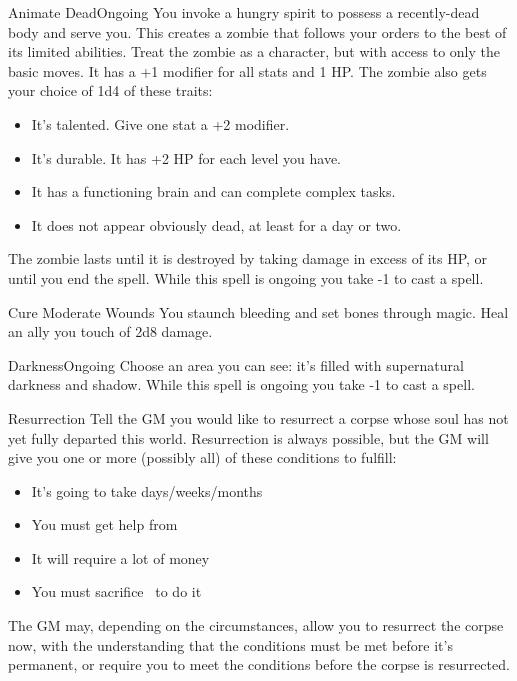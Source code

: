 \documentclass[8pt]{extarticle}
\begin{document}
\begin{multicols}{2}
  \begin{aspell}{Animate Dead}{Ongoing}
    You invoke a hungry spirit to possess a recently-dead body and
    serve you. This creates a zombie that follows your orders to the
    best of its limited abilities. Treat the zombie as a character,
    but with access to only the basic moves. It has a +1 modifier for
    all stats and 1 HP. The zombie also gets your choice of 1d4 of
    these traits:
    \begin{itemize}
    \item It’s talented. Give one stat a +2 modifier.
    \item It’s durable. It has +2 HP for each level you have.
    \item It has a functioning brain and can complete complex tasks.
    \item It does not appear obviously dead, at least for a day or
      two.
    \end{itemize}
    The zombie lasts until it is destroyed by taking damage in excess
    of its HP, or until you end the spell. While this spell is ongoing
    you take -1 to cast a spell.
  \end{aspell}

  \begin{aspell}{Cure Moderate Wounds}{}
    You staunch bleeding and set bones through magic. Heal an ally you
    touch of 2d8 damage.
  \end{aspell}

  \begin{aspell}{Darkness}{Ongoing}
    Choose an area you can see: it’s filled with supernatural darkness
    and shadow.  While this spell is ongoing you take -1 to cast a
    spell.
  \end{aspell}
  \vfill\null
  \columnbreak

  \begin{aspell}{Resurrection}{}
    Tell the GM you would like to resurrect a corpse whose soul has
    not yet fully departed this world. Resurrection is always
    possible, but the GM will give you one or more (possibly all) of
    these conditions to fulfill:
    \begin{itemize}
    \item It’s going to take days/weeks/months
    \item You must get help from \hrulefill
    \item It will require a lot of money
    \item You must sacrifice \hrulefill\ to do it
    \end{itemize}
    The GM may, depending on the circumstances, allow you to resurrect
    the corpse now, with the understanding that the conditions must be
    met before it’s permanent, or require you to meet the conditions
    before the corpse is resurrected.
  \end{aspell}


\end{multicols}
\end{document}
